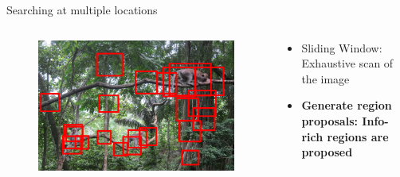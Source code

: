 \documentclass{beamer}[10pt, usepdftitle=false, handout]
\begin{document}
    \begin{frame}

	Searching at multiple locations
	\vspace*{1.0em}	
	
\begin{columns}
\begin{column}{0.5\textwidth}
	\begin{figure}
		\includegraphics[scale=0.2]{monkey-3.jpg} 
	\end{figure}	 
\end{column}
\begin{column}{0.5\textwidth}  %
    \begin{center}
	\begin{itemize}
	\item{Sliding Window: \newline Exhaustive scan of the image}
	\newline
	\item{\textbf{Generate region proposals: \newline Info-rich regions are proposed}}
	\end{itemize}	     
     
     \end{center}
\end{column}
\end{columns}		
	
	
	
	\end{frame}
	
\end{document}
